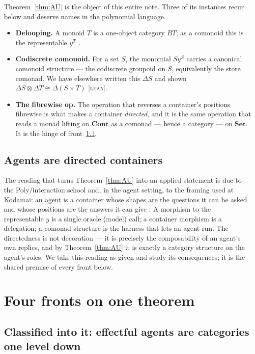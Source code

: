 \documentclass[11pt]{amsart}
\theoremstyle{plain}
\theoremstyle{definition}
\newcommand{\Set}{\mathbf{Set}}
\newcommand{\Cont}{\mathbf{Cont}}
\newcommand{\iso}{\cong}
\newcommand{\gLean}{\textsc{[lean]}}
\begin{document}
Theorem~\ref{thm:AU} is the object of this entire note. Three of its instances recur below and
deserve names in the polynomial language.

\begin{itemize}
\item \textbf{Delooping.} A monoid $T$ is a one-object category $BT$; as a comonoid this is the
representable $y^T$ \cite[Prop.~2.7]{SmitheCAI2}.
\item \textbf{Codiscrete comonoid.} For a set $S$, the monomial $S y^{S}$ carries a canonical
comonoid structure --- the codiscrete groupoid on $S$, equivalently the store comonad. We have
elsewhere written this $\Delta S$ and shown $\Delta S \otimes \Delta T \iso \Delta(S\times T)$
\gLean.
\item \textbf{The fibrewise op.} The operation that reverses a container's positions fibrewise is
what makes a container \emph{directed}, and it is the same operation that reads a monad lifting on
$\Cont$ as a comonad --- hence a category --- on $\Set$. It is the hinge of front~\ref{sub:into}.
\end{itemize}

\subsection*{Agents are directed containers}
The reading that turns Theorem~\ref{thm:AU} into an applied statement is due to the
Poly/interaction school and, in the agent setting, to the framing used at Kodamai: an agent is a
container whose shapes are the questions it can be asked and whose positions are the answers it
can give \cite{NiuSpivak}. A morphism to the representable $y$ is a single oracle (model) call;
a container morphism is a delegation; a comonad structure is the harness that lets an agent run.
The directedness is not decoration --- it is precisely the composability of an agent's own
replies, and by Theorem~\ref{thm:AU} it is exactly a category structure on the agent's roles. We
take this reading as given and study its consequences; it is the shared premise of every front
below.

\section{Four fronts on one theorem}\label{sec:fronts}

\subsection{Classified into it: effectful agents are categories one level down}\label{sub:into}
\end{document}

